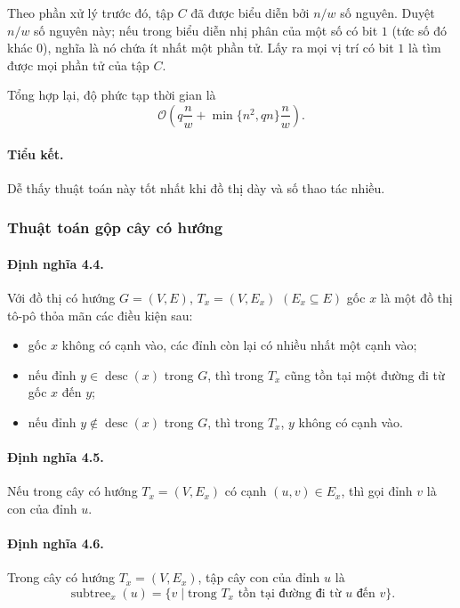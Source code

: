 \documentclass[11pt]{article}
\newcommand{\Oh}{\mathcal{O}}
\begin{document}
Theo phần xử lý trước đó, tập \(C\) đã được biểu diễn bởi \(n/w\) số nguyên.
Duyệt \(n/w\) số nguyên này; nếu trong biểu diễn nhị phân của một số có bit
\(1\) (tức số đó khác \(0\)), nghĩa là nó chứa ít nhất một phần tử. Lấy ra mọi
vị trí có bit \(1\) là tìm được mọi phần tử của tập \(C\).

Tổng hợp lại, độ phức tạp thời gian là
\[
  \Oh\left(q\frac{n}{w}+\min\{n^2,qn\}\frac{n}{w}\right).
\]

\paragraph{Tiểu kết.}
Dễ thấy thuật toán này tốt nhất khi đồ thị dày và số thao tác nhiều.

\subsubsection{Thuật toán gộp cây có hướng}

\paragraph{Định nghĩa 4.4.}
Với đồ thị có hướng \(G=(V,E)\),  \(T_x=(V,E_x)\)
\((E_x\subseteq E)\) gốc \(x\) là một đồ thị tô-pô thỏa mãn các điều kiện sau:
\begin{itemize}
  \item gốc \(x\) không có cạnh vào, các đỉnh còn lại có nhiều nhất một cạnh
  vào;

  \item nếu đỉnh \(y\in\operatorname{desc}(x)\) trong \(G\), thì trong \(T_x\)
  cũng tồn tại một đường đi từ gốc \(x\) đến \(y\);

  \item nếu đỉnh \(y\notin\operatorname{desc}(x)\) trong \(G\), thì trong
  \(T_x\), \(y\) không có cạnh vào.
\end{itemize}

\paragraph{Định nghĩa 4.5.}
Nếu trong cây có hướng \(T_x=(V,E_x)\) có cạnh \((u,v)\in E_x\), thì gọi
đỉnh \(v\) là con của đỉnh \(u\).

\paragraph{Định nghĩa 4.6.}
Trong cây có hướng \(T_x=(V,E_x)\), tập cây con của đỉnh \(u\) là
\[
  \operatorname{subtree}_x(u)
  = \{v\mid \text{trong } T_x \text{ tồn tại đường đi từ } u \text{ đến } v\}.
\]
\end{document}
